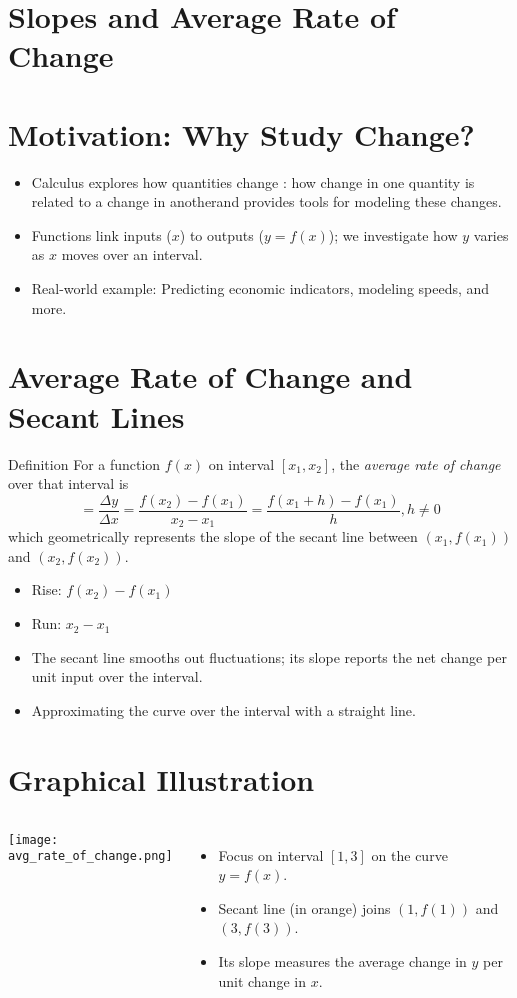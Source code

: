 \section{Slopes and Average Rate of Change}

\section{Motivation: Why Study Change?}
  \begin{itemize}
    \item Calculus explores how quantities change : how change in one quantity is related to a change in anotherand provides tools for modeling these changes.
    \item Functions link inputs ($x$) to outputs ($y=f(x)$); we investigate how $y$ varies as $x$ moves over an interval.
    \item Real-world example: Predicting economic indicators, modeling speeds, and more.
  \end{itemize}

\section{Average Rate of Change and Secant Lines}
  \begin{block}{Definition}
    For a function $f(x)$ on interval $[x_{1},x_{2}]$, the \emph{average rate of change} over that interval is
    \[ 
      = \frac{\Delta y}{\Delta x} = \frac{f(x_{2})-f(x_{1})}{x_{2}-x_{1}} = \frac{f(x_{1}+h) - f(x_{1})}{h}, h \neq 0
    \]
    which geometrically represents the slope of the secant line between $(x_{1},f(x_{1}))$ and $(x_{2},f(x_{2}))$.
  \end{block}
  \begin{itemize}
    \item Rise: $f(x_{2})-f(x_{1})$
    \item Run: $x_{2}-x_{1}$
    \item The secant line smooths out fluctuations; its slope reports the net change per unit input over the interval.
    \item Approximating the curve over the interval with a straight line. 
  \end{itemize}

\section{Graphical Illustration}
  \begin{columns}
      \texttt{[image: avg\_rate\_of\_change.png]}
      \begin{itemize}
        \item Focus on interval $[1,3]$ on the curve $y=f(x)$.
        \item Secant line (in orange) joins $(1,f(1))$ and $(3,f(3))$.
        \item Its slope measures the average change in $y$ per unit change in $x$.
      \end{itemize}
  \end{columns}

